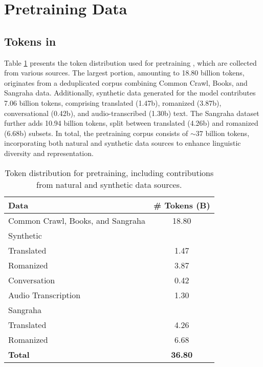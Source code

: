 \section{Pretraining Data}


 \subsection{Tokens in \titu{}}
Table \ref{tab:titulm_tokens} presents the token distribution used for pretraining \titu{}, which are collected from various sources. The largest portion, amounting to 18.80 billion tokens, originates from a deduplicated corpus combining Common Crawl, Books, and Sangraha data. Additionally, synthetic data generated for the model contributes 7.06 billion tokens, comprising translated (1.47b), romanized (3.87b), conversational (0.42b), and audio-transcribed (1.30b) text. The Sangraha dataset further adds 10.94 billion tokens, split between translated (4.26b) and romanized (6.68b) subsets. In total, the \titu{} pretraining corpus consists of $\sim37$ billion tokens, incorporating both natural and synthetic data sources to enhance linguistic diversity and representation.

\begin{table}[h]
    \centering
    \begin{tabular}{p{4cm} c}
        \hline
        \textbf{Data} & \textbf{ \# Tokens (B)} \\
        \hline
        Common Crawl, Books, and Sangraha & 18.80 \\ \midrule
        Synthetic & \\
        \quad Translated & 1.47 \\
        \quad Romanized & 3.87 \\
        \quad Conversation & 0.42 \\
        \quad Audio Transcription & 1.30 \\ \midrule
        Sangraha & \\
        \quad Translated & 4.26 \\
        \quad Romanized & 6.68 \\
        \hline
        \textbf{Total} & \textbf{36.80} \\
        \hline
    \end{tabular}
    \caption{Token distribution for \titu{} pretraining, including contributions from natural and synthetic data sources.}
    \label{tab:titulm_tokens}
\end{table}


